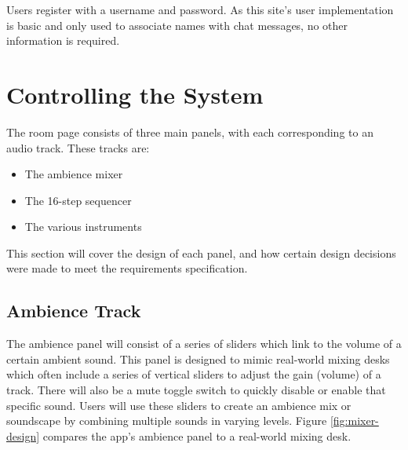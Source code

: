 Users register with a username and password. As this site’s user implementation is basic and only used to associate names with chat messages, no other information is required.


\section{Controlling the System}

The room page consists of three main panels, with each corresponding to an audio track. These tracks are:
\begin{itemize}
    \item The ambience mixer
    \item The 16-step sequencer
    \item The various instruments
\end{itemize}

This section will cover the design of each panel, and how certain design decisions were made to meet the requirements specification.

\subsection{Ambience Track}
The ambience panel will consist of a series of sliders which link to the volume of a certain ambient sound. This panel is designed to mimic real-world mixing desks which often include a series of vertical sliders to adjust the gain (volume) of a track. There will also be a mute toggle switch to quickly disable or enable that specific sound. Users will use these sliders to create an ambience mix or soundscape by combining multiple sounds in varying levels. Figure \ref{fig:mixer-design} compares the app's ambience panel to a real-world mixing desk.

